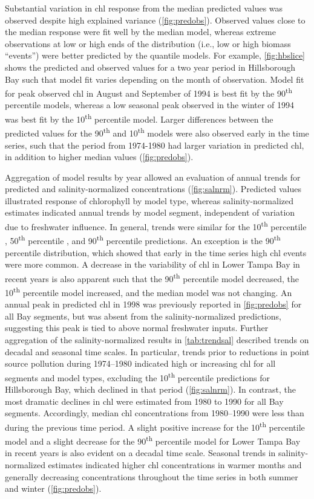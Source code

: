 \documentclass{svjour3}\usepackage[]{graphicx}\usepackage[]{color}
\newcommand{\nine}{90\textsuperscript{th} percentile }
\newcommand{\five}{50\textsuperscript{th} percentile }
\newcommand{\ten}{10\textsuperscript{th} percentile }
\begin{document}
Substantial variation in \ac{chl} response from the median predicted values was observed despite high explained variance (\cref{fig:predobs}).  Observed values close to the median response were fit well by the median model, whereas extreme observations at low or high ends of the distribution (i.e., low or high biomass ``events'') were better predicted by the quantile models. For example, \cref{fig:hbslice} shows the predicted and observed values for a two year period in Hillsborough Bay such that model fit varies depending on the month of observation.  Model fit for peak observed \ac{chl} in August and September of 1994 is best fit by the \nine models, whereas a low seasonal peak observed in the winter of 1994 was best fit by the \ten model.  Larger differences between the predicted values for the 90\textsuperscript{th} and 10\textsuperscript{th} models were also observed early in the time series, such that the period from 1974-1980 had larger variation in predicted \ac{chl}, in addition to higher median values (\cref{fig:predobs}).  

Aggregation of model results by year allowed an evaluation of annual trends for predicted and salinity-normalized concentrations (\cref{fig:salnrm}).  Predicted values illustrated response of chlorophyll by model type, whereas salinity-normalized estimates indicated annual trends by model segment, independent of variation due to freshwater influence.  In general, trends were similar for the \ten, \five, and \nine predictions.  An exception is the \nine distribution, which showed that early in the time series high \ac{chl} events were more common.  A decrease in the variability of \ac{chl} in Lower Tampa Bay in recent years is also apparent such that the \nine model decreased, the \ten model increased, and the median model was not changing.  An annual peak in predicted \ac{chl} in 1998 was previously reported in \cref{fig:predobs} for all Bay segments, but was absent from the salinity-normalized predictions, suggesting this peak is tied to above normal freshwater inputs. Further aggregation of the salinity-normalized results in \cref{tab:trendsal} described trends on decadal and seasonal time scales.  In particular, trends prior to reductions in point source pollution during 1974--1980 indicated high or increasing \ac{chl} for all segments and model types, excluding the \ten predictions for Hillsborough Bay, which declined in that period (\cref{fig:salnrm}).  In contrast, the most dramatic declines in \ac{chl} were estimated from 1980 to 1990 for all Bay segments.  Accordingly, median \ac{chl} concentrations from 1980--1990 were less than during the previous time period.  A slight positive increase for the \ten model and a slight decrease for the \nine model for Lower Tampa Bay in recent years is also evident on a decadal time scale.  Seasonal trends in salinity-normalized estimates indicated higher \ac{chl} concentrations in warmer months and generally decreasing concentrations throughout the time series in both summer and winter (\cref{fig:predobs}).
\end{document}
